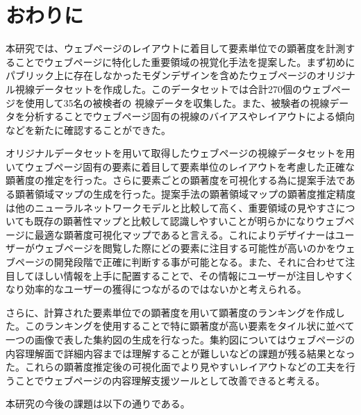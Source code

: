 \newpage
\renewcommand{\baselinestretch}{1.5}
\section{おわりに}
\renewcommand{\baselinestretch}{1}
\par 本研究では、ウェブページのレイアウトに着目して要素単位での顕著度を計測することでウェブページに特化した重要領域の視覚化手法を提案した。まず初めにパブリック上に存在しなかったモダンデザインを含めたウェブページのオリジナル視線データセットを作成した。このデータセットでは合計270個のウェブページを使用して35名の被検者の
視線データを収集した。また、被験者の視線データを分析することでウェブページ固有の視線のバイアスやレイアウトによる傾向などを新たに確認することができた。

\par オリジナルデータセットを用いて取得したウェブページの視線データセットを用いてウェブページ固有の要素に着目して要素単位のレイアウトを考慮した正確な顕著度の推定を行った。さらに要素ごとの顕著度を可視化する為に提案手法である顕著領域マップの生成を行った。提案手法の顕著領域マップの顕著度推定精度は他のニューラルネットワークモデルと比較して高く、重要領域の見やすさについても既存の顕著性マップと比較して認識しやすいことが明らかになりウェブページに最適な顕著度可視化マップであると言える。これによりデザイナーはユーザーがウェブページを閲覧した際にどの要素に注目する可能性が高いのかをウェブページの開発段階で正確に判断する事が可能となる。また、それに合わせて注目してほしい情報を上手に配置することで、その情報にユーザーが注目しやすくなり効率的なユーザーの獲得につながるのではないかと考えられる。

\par さらに、計算された要素単位での顕著度を用いて顕著度のランキングを作成した。このランキングを使用することで特に顕著度が高い要素をタイル状に並べて一つの画像で表した集約図の生成を行なった。集約図についてはウェブページの内容理解面で詳細内容までは理解することが難しいなどの課題が残る結果となった。これらの顕著度推定後の可視化面でより見やすいレイアウトなどの工夫を行うことでウェブページの内容理解支援ツールとして改善できると考える。\\

\par 本研究の今後の課題は以下の通りである。

